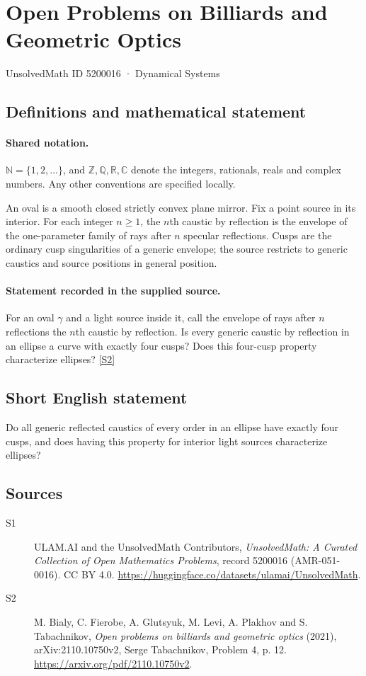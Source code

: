 \documentclass[11pt]{article}
\newcommand{\sref}[2]{\hyperlink{source:#1:#2}{[S#2]}}
\begin{document}
\setcounter{section}{5200015}
\section{Open Problems on Billiards and Geometric Optics}\label{5200016}
{\small\sffamily UnsolvedMath ID 5200016 · Dynamical Systems}
\subsection{Definitions and mathematical statement}

\paragraph{Shared notation.}$\mathbb N=\{1,2,\ldots\}$, and $\mathbb Z,\mathbb Q,\mathbb R,\mathbb C$ denote the integers, rationals, reals and complex numbers. Any other conventions are specified locally.


An oval is a smooth closed strictly convex plane mirror. Fix a point source in its interior. For each integer $n\ge1$, the $n$th caustic by reflection is the envelope of the one-parameter family of rays after $n$ specular reflections. Cusps are the ordinary cusp singularities of a generic envelope; the source restricts to generic caustics and source positions in general position.
\paragraph{Statement recorded in the supplied source.}
For an oval $\gamma$ and a light source inside it, call the envelope of rays after $n$ reflections the $n$th caustic by reflection. Is every generic caustic by reflection in an ellipse a curve with exactly four cusps? Does this four-cusp property characterize ellipses? \sref{5200016}{2}
\subsection{Short English statement}
Do all generic reflected caustics of every order in an ellipse have exactly four cusps, and does having this property for interior light sources characterize ellipses?
\subsection{Sources}
\begin{description}
\item[\hypertarget{source:5200016:1}{S1}] ULAM.AI and the UnsolvedMath Contributors, \emph{UnsolvedMath: A Curated Collection of Open Mathematics Problems}, record 5200016 (AMR-051-0016). CC BY 4.0. \url{https://huggingface.co/datasets/ulamai/UnsolvedMath}.
\item[\hypertarget{source:5200016:2}{S2}] M. Bialy, C. Fierobe, A. Glutsyuk, M. Levi, A. Plakhov and S. Tabachnikov, \emph{Open problems on billiards and geometric optics} (2021), arXiv:2110.10750v2, Serge Tabachnikov, Problem 4, p. 12. \url{https://arxiv.org/pdf/2110.10750v2}.
\end{description}
\label{end:5200016}
\end{document}
